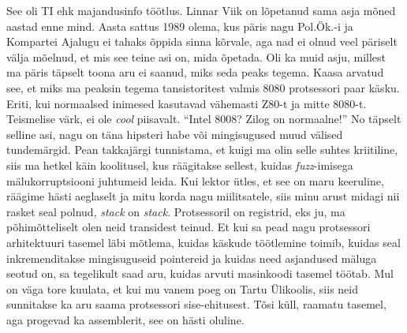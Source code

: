 See oli TI ehk majandusinfo töötlus. Linnar 
Viik on lõpetanud sama asja mõned aastad enne mind. 
Aasta sattus 1989 olema, kus päris nagu Pol.Ök.-i ja Kompartei 
Ajalugu ei tahaks õppida sinna kõrvale, aga nad ei olnud veel päriselt välja 
mõelnud, et mis see teine asi on, mida õpetada. Oli ka muid asju, millest ma 
päris täpselt toona aru ei saanud, miks seda peaks tegema. Kaasa arvatud see, 
et miks ma peaksin tegema tansistoritest valmis 8080 protsessori paar käsku. 
Eriti, kui normaalsed inimesed kasutavad vähemasti Z80-t ja mitte 8080-t. 
Teismelise värk, ei ole \emph{cool} piisavalt. \enquote{Intel 8008? 
Zilog on normaalne!} No 
täpselt selline asi, nagu on täna hipsteri habe või mingisugused muud välised 
tundemärgid. Pean takkajärgi tunnistama, et kuigi ma olin selle suhtes 
kriitiline, siis ma hetkel käin koolitusel, kus räägitakse sellest, kuidas 
\emph{fuzz}-imisega 
mälukorruptsiooni juhtumeid leida. Kui lektor ütles, et see on maru  keeruline, 
räägime hästi aeglaselt ja mitu korda nagu miilitsatele, siis minu arust midagi 
nii rasket seal polnud, \emph{stack} on \emph{stack}. Protsessoril on 
registrid, eks ju, ma põhimõtteliselt olen neid transidest teinud. Et kui sa 
pead nagu protsessori arhitektuuri tasemel läbi mõtlema, kuidas käskude 
töötlemine toimib, kuidas seal inkremenditakse mingisuguseid pointereid ja 
kuidas need asjandused  mäluga seotud on, sa tegelikult saad aru, kuidas arvuti 
masinkoodi tasemel töötab. Mul on  väga tore kuulata, et kui mu vanem poeg on 
Tartu Ülikoolis, siis neid sunnitakse ka aru saama protsessori sise-ehitusest. 
Tõsi küll,  raamatu tasemel, aga progevad ka assemblerit, see on hästi oluline. 


